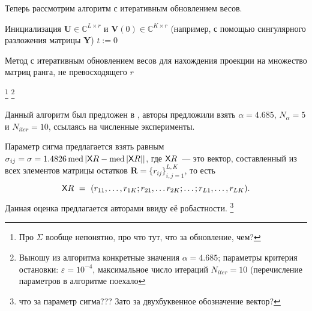 \documentclass[specialist,
               substylefile = spbu.rtx,
               subf,href,colorlinks=true, 12pt]{disser}
\DeclareMathOperator{\med}{med}
\begin{document}
Теперь рассмотрим алгоритм с итеративным обновлением весов.

\begin{algorithm}[H]
\SetAlgoLined
{}
 Инициализация $\mathbf{U} \in \mathbb{C}^{L\times r}$ и $\mathbf{V}(0) \in \mathbb{C}^{K\times r}$ (например, с помощью сингулярного разложения матрицы $\mathbf{Y}$)\;
 $t := 0$\;
 \caption{Метод с итеративным обновлением весов для нахождения проекции на множество матриц ранга, не превосходящего $r$}
\end{algorithm}

\footnote{Про $\Sigma$ вообще непонятно, про что тут, что за обновление, чем?}
\footnote{Выношу из алгоритма конкретные значения $\alpha = 4.685$; параметры критерия остановки: $\varepsilon = 10^{-4}$, максимальное число итераций $N_{iter} = 10$ (перечисление параметров в алгоритме поехало}

Данный алгоритм был предложен в \cite{Chen}, авторы предложили взять $\alpha = 4.685$, $N_{\alpha} = 5$ и $N_{iter} = 10$, ссылаясь на численные эксперименты.

Параметр сигма предлагается взять равным $\sigma_{ij} = \sigma = 1.4826 \med {|\tX{R}-\med {|\tX{R}|}|}$, где $\textsf{X}{R}$~--- это вектор, составленный из всех элементов матрицы остатков $\mathbf{R} = \{r_{ij}\}_{i,j=1}^{L,K}$, то есть
\begin{equation*}
	\textsf{X}{R}~=~(r_{11},\ldots,r_{1K}; r_{21},\ldots r_{2K};\ldots;r_{L1},\ldots,r_{LK}).
\end{equation*}
Данная оценка предлагается авторами ввиду её робастности.
\footnote{что за параметр сигма??? Зато за двухбуквенное обозначение вектор?}
\end{document}
